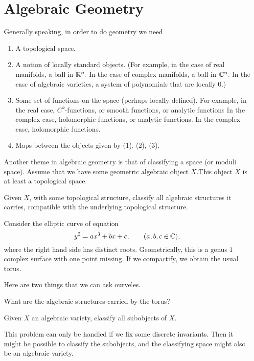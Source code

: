 \section{Algebraic Geometry}
Generally speaking, in order to do geometry we need
\begin{enumerate}[label=(\arabic*)]
\item A topological space.
\item A notion of locally standard objects. (For example, in the case of
  real manifolds, a ball in $\mathbb{R}^n$. In the case of complex manifolds, a
  ball in $\mathbb{C}^n$. In the case of algebraic varieties, a system of
  polynomials that are locally $0$.)
\item Some set of functions on the space (perhaps locally defined). For
  example, in the real case, $C^k$-functions, or smooth functions, or
  analytic functions In the complex case, holomorphic functions, or
  analytic functions. In the complex case, holomorphic functions.
\item Maps between the objects given by (1), (2), (3).
\end{enumerate}

Another theme in algebraic geometry is that of classifying a space (or
moduli space). Assume that we have some geometric algebraic object $X$.This
object $X$ is at least a topological space.

\begin{question}
  Given $X$, with some topological structure, classify all algebraic
  structures it carries, compatible with the underlying topological
  structure.
\end{question}

\begin{example}
  Consider the elliptic curve of equation
  \[
    y^2=ax^3+bx+c,\qquad(a,b,c\in\mathbb{C}),
  \]
  where the right hand side has distinct roots. Geometrically, this is a
  genus $1$ complex surface with one point missing. If we compactify, we
  obtain the usual torus.
\end{example}

Here are two things that we can ask ourveles.

What are the algebraic structures carried by the torus?

Given $X$ an algebraic variety, classify all subobjects of $X$.

This problem can only be handled if we fix some discrete invariants. Then
it might be possible to classify the subobjects, and the classifying space
might also be an algebraic variety.

